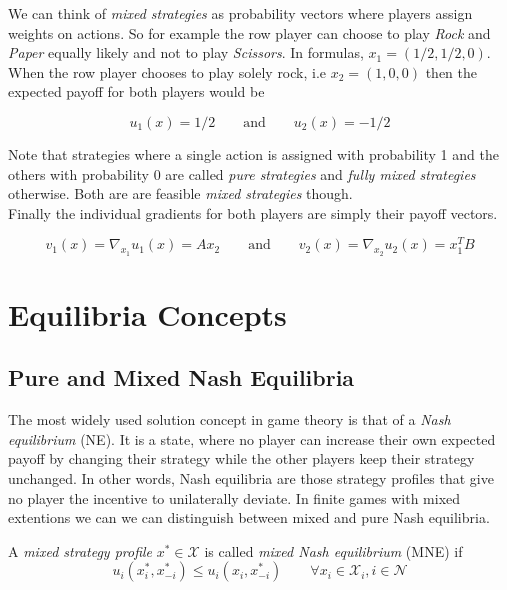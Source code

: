 We can think of \textit{mixed strategies} as probability vectors where players assign weights on actions. So for example the row player can choose to play \textit{Rock} and \textit{Paper} equally likely and not to play \textit{Scissors}. In formulas, $x_1 = (1/2,1/2,0)$. When the row player chooses to play solely rock, i.e $x_2 = (1,0,0)$ then the expected payoff for both players would be

\begin{equation*}
    u_1(x) = 1/2  \qquad \text{and} \qquad u_2(x) = -1/2
\end{equation*}

Note that strategies where a single action is assigned with probability 1 and the others with probability 0 are called \textit{pure strategies} and \textit{fully mixed strategies} otherwise. Both are are feasible \textit{mixed strategies} though. \\ 

Finally the individual gradients for both players are simply their payoff vectors.

\begin{equation*}
    v_1(x) = \nabla_{x_1}u_1(x) = Ax_2 \qquad \text{and} \qquad v_2(x) = \nabla_{x_2}u_2(x) = x_{1}^{T}B
\end{equation*}


\section{Equilibria Concepts}\label{section:equilibriaConcepts}

\subsection{Pure and Mixed Nash Equilibria}\label{subsection:PNEandMNE}

The most widely used solution concept in game theory is that of a \textit{Nash equilibrium} (NE). It is a state, where no player can increase their own expected payoff by changing their strategy while the other players keep their strategy unchanged. In other words, Nash equilibria are those strategy profiles that give no player the incentive to unilaterally deviate. In finite games with mixed extentions we can we can distinguish between mixed and pure Nash equilibria. 

\begin{definition}\label{def:MNE}
A \textit{mixed strategy profile} $x^* \in \mathcal{X}$ is called \textit{mixed Nash equilibrium} (MNE) if
    \[u_i(x_{i}^{*},x_{-i}^{*}) \le  u_i(x_{i},x_{-i}^{*}) \qquad \forall x_i \in \mathcal{X}_i, i \in \mathcal{N}\]
\end{definition}

